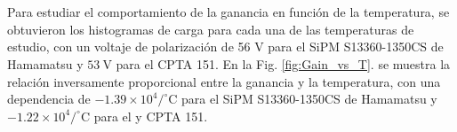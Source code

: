 \\ \\
Para estudiar el comportamiento de la ganancia en función de la temperatura, se obtuvieron los histogramas de carga para cada una de las temperaturas de estudio, con un voltaje de polarización de 56 V para el SiPM S13360-1350CS de Hamamatsu y $53~\mbox{V}$ para el CPTA 151. En la Fig. \ref{fig:Gain_vs_T}. se muestra la relación inversamente proporcional entre la ganancia y la temperatura, con una dependencia de $-1.39\times 10^4/^\circ$C para el SiPM S13360-1350CS de Hamamatsu y $-1.22\times 10^4/^\circ$C para el  y CPTA 151.
